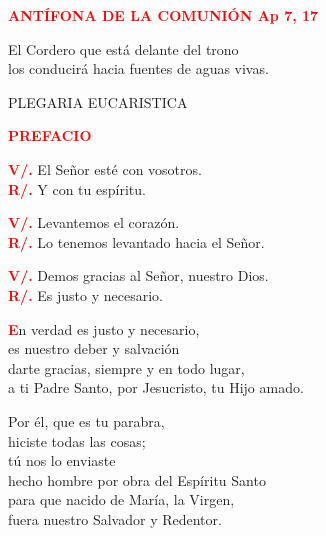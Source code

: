 \documentclass[12pt, letterpaper]{report}
\begin{document}
\Large {\bfseries \textcolor{red}{ANT\'IFONA DE LA COMUNI\'ON \hspace{1cm} Ap 7, 17}} \newline

\Large El Cordero que est\'a delante del trono \\
los conducir\'a hacia fuentes de aguas vivas.

\newpage

\begin{center}
\Large PLEGARIA EUCARISTICA
\end{center}

\Large {\bfseries \textcolor{red}{PREFACIO}} \newline

\noindent
\Large {\bfseries \textcolor{red}{V/.}} \hspace{0.5cm} El Se\~nor est\'e con vosotros. \\
\Large {\bfseries \textcolor{red}{R/.}} \hspace{0.5cm} Y con tu esp\'iritu. \newline

\noindent
\Large {\bfseries \textcolor{red}{V/.}} \hspace{0.5cm} Levantemos el coraz\'on. \\
\Large {\bfseries \textcolor{red}{R/.}} \hspace{0.5cm} Lo tenemos levantado hacia el Se\~nor. \newline

\noindent
\Large {\bfseries \textcolor{red}{V/.}} \hspace{0.5cm} Demos gracias al Se\~nor, nuestro Dios. \\
\Large {\bfseries \textcolor{red}{R/.}} \hspace{0.5cm} Es justo y necesario.

\lettrine[lines=1]{\bfseries \textcolor{red}{E}}{}\Large n verdad es justo y necesario, \\
es nuestro deber y salvaci\'on \\
darte gracias, siempre y en todo lugar, \\
a ti Padre Santo, por Jesucristo, tu Hijo amado. \newline

Por \'el, que es tu parabra, \\
hiciste todas las cosas; \\
t\'u nos lo enviaste \\
hecho hombre por obra del Esp\'iritu Santo \\
para que nacido de Mar\'ia, la Virgen, \\
fuera nuestro Salvador y Redentor. \newline
\end{document}
